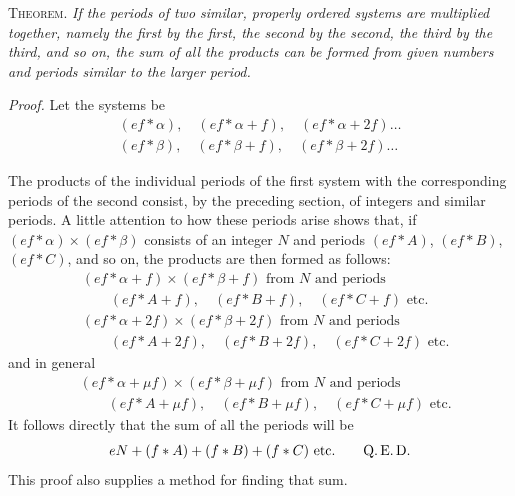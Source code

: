\textsc{Theorem.} \emph{If the periods of two similar, properly ordered systems are multiplied together, namely the first by the first, the second by the second, the third by the third, and so on, the sum of all the products can be formed from given numbers and periods similar to the larger period.}

\emph{Proof.} Let the systems be
\[
\begin{gathered}
(ef\ast\alpha),\quad(ef\ast\alpha+f),\quad(ef\ast\alpha+2f)\ldots\\
(ef\ast\beta),\quad(ef\ast\beta+f),\quad(ef\ast\beta+2f)\ldots
\end{gathered}
\]

The products of the individual periods of the first system with the corresponding periods of the second consist, by the preceding section, of integers and similar periods. A little attention to how these periods arise shows that, if $(ef\ast\alpha)\times(ef\ast\beta)$ consists of an integer $N$ and periods $(ef\ast A)$, $(ef\ast B)$, $(ef\ast C)$, and so on, the products are then formed as follows:
\[
\begin{aligned}
&(ef\ast\alpha+f)\times(ef\ast\beta+f)\text{ from }N\text{ and periods}\\
&\hspace{2em}(ef\ast A+f),\quad(ef\ast B+f),\quad(ef\ast C+f)\text{ etc.}\\
&(ef\ast\alpha+2f)\times(ef\ast\beta+2f)\text{ from }N\text{ and periods}\\
&\hspace{2em}(ef\ast A+2f),\quad(ef\ast B+2f),\quad(ef\ast C+2f)\text{ etc.}
\end{aligned}
\]
and in general
\[
\begin{aligned}
&(ef\ast\alpha+\mu f)\times(ef\ast\beta+\mu f)\text{ from }N\text{ and periods}\\
&\hspace{2em}(ef\ast A+\mu f),\quad(ef\ast B+\mu f),\quad(ef\ast C+\mu f)\text{ etc.}
\end{aligned}
\]
It follows directly that the sum of all the periods will be
\[
eN+(f\ast A)+(f\ast B)+(f\ast C)\text{ etc.}\qquad\text{Q.\,E.\,D.}
\]
This proof also supplies a method for finding that sum.

